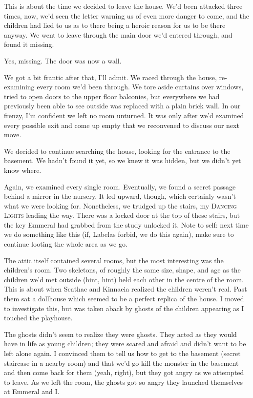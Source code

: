 This is about the time we decided to leave the house. We'd been attacked three times, now, we'd seen the letter warning us of even more danger to come, and the children had lied to us as to there being a heroic reason for us to be there anyway. We went to leave through the main door we'd entered through, and found it missing.

Yes, missing. The door was now a wall.

We got a bit frantic after that, I'll admit. We raced through the house, re-examining every room we'd been through. We tore aside curtains over windows, tried to open doors to the upper floor balconies, but everywhere we had previously been able to see outside was replaced with a plain brick wall. In our frenzy, I'm confident we left no room unturned. It was only after we'd examined every possible exit and come up empty that we reconvened to discuss our next move.

We decided to continue searching the house, looking for the entrance to the basement. We hadn't found it yet, so we knew it was hidden, but we didn't yet know where.

Again, we examined every single room. Eventually, we found a secret passage behind a mirror in the nursery. It led upward, though, which certainly wasn't what we were looking for. Nonetheless, we trudged up the stairs, my \textsc{Dancing Lights} leading the way. There was a locked door at the top of these stairs, but the key Emmeral had grabbed from the study unlocked it. Note to self: next time we do something like this (if, Labelas forbid, we do this again), make sure to continue looting the whole area as we go.

The attic itself contained several rooms, but the most interesting was the children's room. Two skeletons, of roughly the same size, shape, and age as the children we'd met outside (hint, hint) held each other in the centre of the room. This is about when Scathac and Kinnaeia realized the children weren't real. Past them sat a dollhouse which seemed to be a perfect replica of the house. I moved to investigate this, but was taken aback by ghosts of the children appearing as I touched the playhouse.

The ghosts didn't seem to realize they were ghosts. They acted as they would have in life as young children; they were scared and afraid and didn't want to be left alone again. I convinced them to tell us how to get to the basement (secret staircase in a nearby room) and that we'd go kill the monster in the basement and then come back for them (yeah, right), but they got angry as we attempted to leave. As we left the room, the ghosts got so angry they launched themselves at Emmeral and I.

